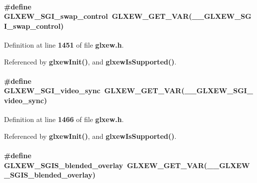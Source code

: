 \paragraph[{G\+L\+X\+E\+W\+\_\+\+S\+G\+I\+\_\+swap\+\_\+control}]{\setlength{\rightskip}{0pt plus 5cm}\#define G\+L\+X\+E\+W\+\_\+\+S\+G\+I\+\_\+swap\+\_\+control~{\bf G\+L\+X\+E\+W\+\_\+\+G\+E\+T\+\_\+\+V\+AR}({\bf \+\_\+\+\_\+\+G\+L\+X\+E\+W\+\_\+\+S\+G\+I\+\_\+swap\+\_\+control})}\label{glxew_8h_aae6ac0611b12398ae44873513c7f7ac4}


Definition at line {\bf 1451} of file {\bf glxew.\+h}.



Referenced by {\bf glxew\+Init()}, and {\bf glxew\+Is\+Supported()}.

\paragraph[{G\+L\+X\+E\+W\+\_\+\+S\+G\+I\+\_\+video\+\_\+sync}]{\setlength{\rightskip}{0pt plus 5cm}\#define G\+L\+X\+E\+W\+\_\+\+S\+G\+I\+\_\+video\+\_\+sync~{\bf G\+L\+X\+E\+W\+\_\+\+G\+E\+T\+\_\+\+V\+AR}({\bf \+\_\+\+\_\+\+G\+L\+X\+E\+W\+\_\+\+S\+G\+I\+\_\+video\+\_\+sync})}\label{glxew_8h_a023d406c4d4911e73c32747ad12275e8}


Definition at line {\bf 1466} of file {\bf glxew.\+h}.



Referenced by {\bf glxew\+Init()}, and {\bf glxew\+Is\+Supported()}.

\paragraph[{G\+L\+X\+E\+W\+\_\+\+S\+G\+I\+S\+\_\+blended\+\_\+overlay}]{\setlength{\rightskip}{0pt plus 5cm}\#define G\+L\+X\+E\+W\+\_\+\+S\+G\+I\+S\+\_\+blended\+\_\+overlay~{\bf G\+L\+X\+E\+W\+\_\+\+G\+E\+T\+\_\+\+V\+AR}({\bf \+\_\+\+\_\+\+G\+L\+X\+E\+W\+\_\+\+S\+G\+I\+S\+\_\+blended\+\_\+overlay})}\label{glxew_8h_a4273bd11616638a00ff50c42b7034c2d}


